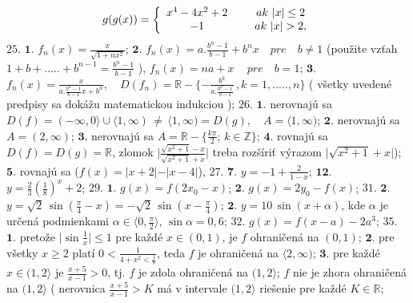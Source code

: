 \begin{align*} 
g(g(x))= \left\{ \begin{array}{cc} 
                x^{4}-4x^{2}+2 & \hspace{5mm} ak\ \vert x \vert\leq 2  \\
                -1 & \hspace{5mm} ak\ \vert x \vert > 2 , \\
                \end{array} \right.
\end{align*} 
$\boxed{25.}$ 
$\boldsymbol{1.}$
$ f_{n}(x)= \frac{x}{\sqrt{1+nx^{2}}} $;
$\boldsymbol{2.}$
$ f_{n}(x)= a. \frac{b^{n}-1}{b-1}+b^{n}x \quad pre \quad b \ne 1$ (použite vzťah $ 1+b+.....+b^{n-1}=\frac{b^{n}-1}{b-1} $ ),  $ f_{n}(x)= na+x \, \quad pre \quad b=1 $;
$\boldsymbol{3.}$
$ f_{n}(x)= \frac{x}{a. \frac{b^{n}-1}{b-1}x+b^{n}}, \quad D(f_{n}) = \mathbb{R}- \lbrace - \frac{b^{k}}{a. \frac{b^{n}-1}{b-1}}\, , k=1,.....,n\rbrace $ ( všetky uvedené predpisy sa dokážu matematickou indukciou );
$\boxed{26.}$ 
$\boldsymbol{1.}$
nerovnajú sa $ D(f) = (-\infty, 0\rangle \cup \langle 1, \infty) \, \ne \, \langle 1, \infty) = D(g), \quad A=\langle 1, \infty) $;
$\boldsymbol{2.}$
nerovnajú sa $ A = (2, \infty) $;
$\boldsymbol{3.}$
nerovnajú sa $ A = \mathbb{R}- \lbrace \frac{k \pi}{2}; \, k \in \mathbb{Z}\rbrace $;
$\boldsymbol{4.}$
rovnajú sa $ D(f)=D(g)= \mathbb{R} $, zlomok $ \vert \frac{\sqrt{x^{2}+1}-x}{\sqrt{x^{2}+1}+x}\vert  $ treba rozšíriť výrazom $ \vert\sqrt{x^{2}+1}+x\vert $);
$\boldsymbol{5.}$
rovnajú sa ($ f(x) = \vert x+2 \vert - \vert x-4 \vert $),
$\boxed{27.}$ 
$\boldsymbol{7.}$
$ y=-1+ \frac{2}{1-x} $;
$\boldsymbol{12.}$
$ y= \frac{2}{3}( \frac{1}{8})^{x}+2 $;
$\boxed{29.}$ 
$\boldsymbol{1.}$
$ g(x)=f(2x_{0}-x) $;
$\boldsymbol{2.}$
$ g(x)=2y_{0}-f(x) $;
$\boxed{31.}$ 
$\boldsymbol{2.}$
$ y=  \sqrt{2}\, \sin (\frac{\pi}{4}-x)=-\sqrt{2}\, \sin (x-\frac{\pi}{4}) $;
$\boldsymbol{2.}$
$ y=10 \, \sin (x+ \alpha) $, kde $ \alpha $ je určená podmienkami $ \alpha \in \langle 0, \frac{\pi}{2}\rangle, \,  \sin \alpha = 0,6 $;
$\boxed{32.}$ 
$ g(x)=f(x-a)-2a^{3} $;
$\boxed{35.}$ 
$\boldsymbol{1.}$
pretože $ \vert \sin \frac{1}{x}  \vert \leq 1 $ pre každé $ x \in (0,1) $, je $ f $ ohraničená na 
$ (0,1) $;
$\boldsymbol{2.}$
pre všetky $ x \geq 2$ platí $ 0  < \frac{1}{4+x^{2}  < \frac{1}{8}} $, teda $ f $ je ohraničená na $ \langle2, \infty) $;
$\boldsymbol{3.}$
pre každé $ x \in (1,2 \rangle $ je $ \frac{x+5}{x-1} >0 $, tj. $ f $ je zdola ohraničená na $ (1,2 \rangle  $; $ f $ nie je zhora ohraničená na $ (1,2 \rangle  $  ( nerovnica $ \frac{x+5}{x-1} >K $ má v intervale $ (1,2 \rangle  $ riešenie pre každé $ K \in \mathbb{R} $;
